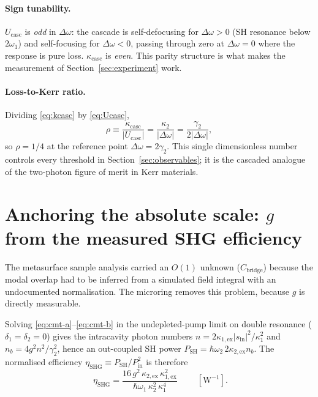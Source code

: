 \documentclass[11pt,a4paper]{article}
\newcommand{\Dom}{\Delta\omega}
\newcommand{\Ucasc}{U_{\text{casc}}}
\newcommand{\kcasc}{\kappa_{\text{casc}}}
\newcommand{\etanorm}{\eta_{\text{SHG}}}
\begin{document}
\paragraph{Sign tunability.}  $\Ucasc$ is \emph{odd} in $\Dom$: the
cascade is self-defocusing for $\Dom>0$ (SH resonance below $2\omega_1$)
and self-focusing for $\Dom<0$, passing through zero at $\Dom=0$ where
the response is pure loss.  $\kcasc$ is \emph{even}.  This parity
structure is what makes the measurement of
Section~\ref{sec:experiment} work.

\paragraph{Loss-to-Kerr ratio.}  Dividing \eqref{eq:kcasc} by
\eqref{eq:Ucasc},
\begin{equation}
  \rho\equiv\frac{\kcasc}{|\Ucasc|}=\frac{\kappa_2}{|\Dom|}
        =\frac{\gamma_2}{2|\Dom|},
  \label{eq:rho}
\end{equation}
so $\rho=1/4$ at the reference point $\Dom=2\gamma_2$.  This single
dimensionless number controls every threshold in
Section~\ref{sec:observables}; it is the cascaded analogue of the
two-photon figure of merit in Kerr materials.

\section{Anchoring the absolute scale: \texorpdfstring{$g$}{g} from the measured SHG efficiency}
\label{sec:anchor}

The metasurface sample analysis carried an $O(1)$ unknown
($C_{\text{bridge}}$) because the modal overlap had to be inferred from
a simulated field integral with an undocumented normalisation.  The
microring removes this problem, because $g$ is directly measurable.

Solving \eqref{eq:cmt-a}--\eqref{eq:cmt-b} in the undepleted-pump limit
on double resonance ($\delta_1=\delta_2=0$) gives the intracavity photon
numbers $n=2\kappa_{1,\text{ex}}|s_{\text{in}}|^2/\kappa_1^2$ and
$n_b=4g^2n^2/\gamma_2^2$, hence an out-coupled SH power
$P_{\text{SH}}=\hbar\omega_2\,2\kappa_{2,\text{ex}}n_b$.  The normalised
efficiency $\etanorm\equiv P_{\text{SH}}/P_{\text{in}}^2$ is therefore
\begin{equation}
  \boxed{\;\etanorm=\frac{16\,g^2\,\kappa_{2,\text{ex}}\,\kappa_{1,\text{ex}}^2}
                        {\hbar\omega_1\,\kappa_2^2\,\kappa_1^4}\;}
  \qquad[\mathrm{W^{-1}}].
  \label{eq:etaSHG}
\end{equation}
\end{document}
